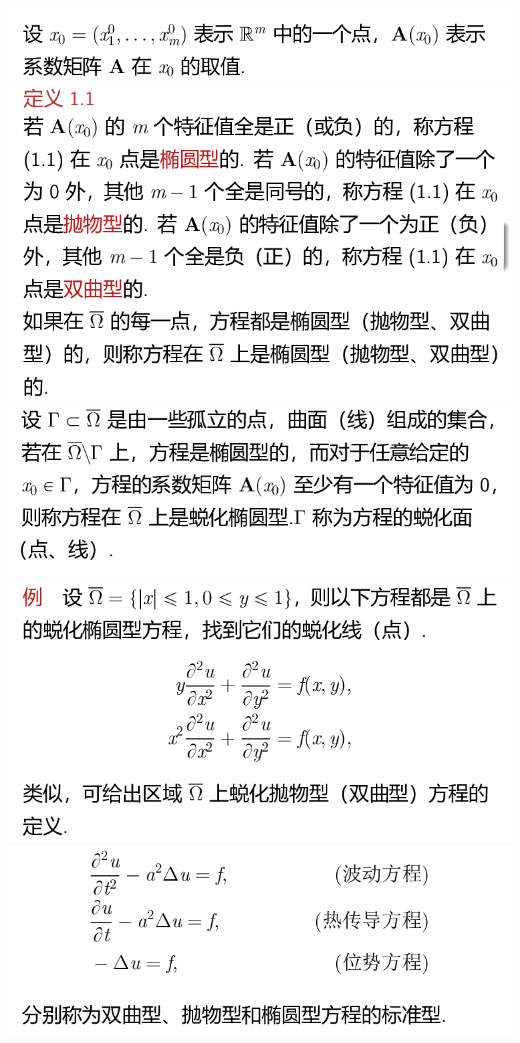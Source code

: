 \documentclass[11pt,a4paper]{ctexart}
\begin{document}
\begin{paracol}{2}
\includegraphics[width=\linewidth]{chap05_09.png}
\includegraphics[width=\linewidth]{chap05_10.png}
\includegraphics[width=\linewidth]{chap05_11.png}
\newpage
\includegraphics[width=\linewidth]{chap05_12.png}
\includegraphics[width=\linewidth]{chap05_13.png}

\end{paracol}
\end{document}

